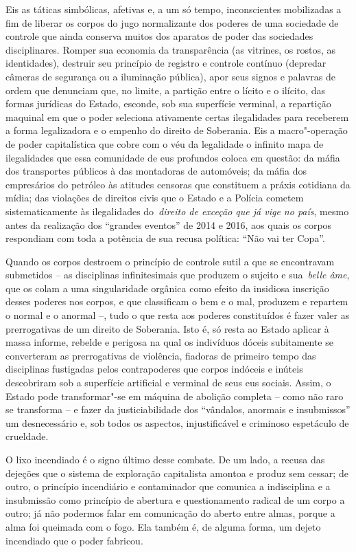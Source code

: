 Eis as táticas simbólicas, afetivas e, a um só tempo, inconscientes
mobilizadas a fim de liberar os corpos do jugo normalizante dos poderes
de uma sociedade de controle que ainda conserva muitos dos aparatos de
poder das sociedades disciplinares. Romper sua economia da transparência
(as vitrines, os rostos, as identidades), destruir seu princípio de
registro e controle contínuo (depredar câmeras de segurança ou a
iluminação pública), apor seus signos e palavras de ordem que denunciam
que, no limite, a partição entre o lícito e o ilícito, das formas
jurídicas do Estado, esconde, sob sua superfície verminal, a repartição
maquinal em que o poder seleciona ativamente certas ilegalidades para
receberem a forma legalizadora e o empenho do direito de Soberania. Eis
a macro"-operação de poder capitalística que cobre com o véu da
legalidade o infinito mapa de ilegalidades que essa comunidade de eus
profundos coloca em questão: da máfia dos transportes públicos à das
montadoras de automóveis; da máfia dos empresários do petróleo às
atitudes censoras que constituem a práxis cotidiana da mídia; das
violações de direitos civis que o Estado e a Polícia cometem
sistematicamente às ilegalidades do~\emph{\emph{direito de exceção que
já vige no país}}, mesmo antes da realização dos ``grandes eventos'' de
2014 e 2016, aos quais os corpos respondiam com toda a potência de sua
recusa política: ``Não vai ter Copa''.

Quando os corpos destroem o princípio de controle sutil a que se
encontravam submetidos -- as disciplinas infinitesimais que produzem o
sujeito e sua~\emph{belle âme}, que os colam a uma singularidade
orgânica como efeito da insidiosa inscrição desses poderes nos corpos, e
que classificam o bem e o mal, produzem e repartem o normal e o anormal
--, tudo o que resta aos poderes constituídos é fazer valer as
prerrogativas de um direito de Soberania. Isto é, só resta ao Estado
aplicar à massa informe, rebelde e perigosa na qual os indivíduos dóceis
subitamente se converteram as prerrogativas de violência, fiadoras de
primeiro tempo das disciplinas fustigadas pelos contrapoderes que corpos
indóceis e inúteis descobriram sob a superfície artificial e verminal de
seus eus sociais. Assim, o Estado pode transformar"-se em máquina de
abolição completa -- como não raro se transforma -- e fazer da
justiciabilidade dos ``vândalos, anormais e insubmissos'' um
desnecessário e, sob todos os aspectos, injustificável e criminoso
espetáculo de crueldade.

O lixo incendiado é o signo último desse combate. De um lado, a recusa
das dejeções que o sistema de exploração capitalista amontoa e produz
sem cessar; de outro, o princípio incendiário e contaminador que
comunica a indisciplina e a insubmissão como princípio de abertura e
questionamento radical de um corpo a outro; já não podermos falar em
comunicação do aberto entre almas, porque a alma foi queimada com o
fogo. Ela também é, de alguma forma, um dejeto incendiado que o poder
fabricou.

